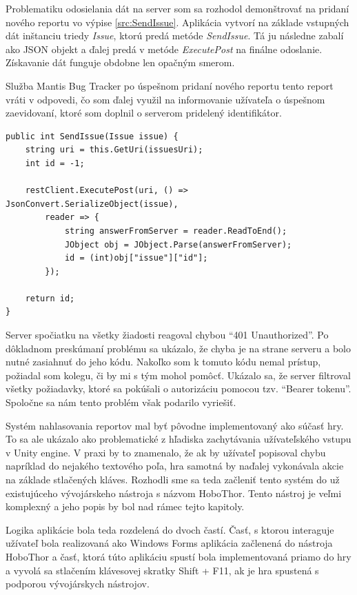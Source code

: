 \documentclass[slovak, bachelorpractice]{diploma}
\begin{document}
Problematiku odosielania dát na server som sa rozhodol demonštrovať na pridaní nového reportu vo výpise \ref{src:SendIssue}. Aplikácia vytvorí na základe vstupných dát inštanciu triedy \textit{Issue}, ktorú predá metóde \textit{SendIssue}. Tá ju následne zabalí ako JSON objekt a ďalej predá v metóde \textit{ExecutePost} na finálne odoslanie. Získavanie dát funguje obdobne len opačným smerom. 

Služba Mantis Bug Tracker po úspešnom pridaní nového reportu tento report vráti v odpovedi, čo som ďalej využil na informovanie užívateľa o úspešnom zaevidovaní, ktoré som doplnil o serverom pridelený identifikátor.
\vspace{10pt}
\begin{lstlisting}[label=src:SendIssue,caption={Programové odoslanie záznamu o chybe do služby Mantis Bug Tracker}]
public int SendIssue(Issue issue) {
	string uri = this.GetUri(issuesUri);
	int id = -1;

	restClient.ExecutePost(uri, () => JsonConvert.SerializeObject(issue),
        reader => {
            string answerFromServer = reader.ReadToEnd();
            JObject obj = JObject.Parse(answerFromServer);
            id = (int)obj["issue"]["id"];
        });

    return id;
}
\end{lstlisting}
Server spočiatku na všetky žiadosti reagoval chybou \enquote{401 Unauthorized}. Po dôkladnom preskúmaní problému sa ukázalo, že chyba je na strane serveru a bolo nutné zasiahnuť do jeho kódu. Nakoľko som k tomuto kódu nemal prístup, požiadal som kolegu, či by mi s tým mohol pomôcť. Ukázalo sa, že server filtroval všetky požiadavky, ktoré sa pokúšali o autorizáciu pomocou tzv. \enquote{Bearer tokenu}. Spoločne sa nám tento problém však podarilo vyriešiť. 

Systém nahlasovania reportov mal byť pôvodne implementovaný ako súčasť hry. To sa ale ukázalo ako problematické z hľadiska zachytávania užívateľského vstupu v Unity engine. V praxi by to znamenalo, že ak by užívateľ popisoval chybu napríklad do nejakého textového poľa, hra samotná by naďalej vykonávala akcie na základe stlačených kláves. Rozhodli sme sa teda začleniť tento systém do už existujúceho vývojárskeho nástroja s názvom HoboThor. Tento nástroj je veľmi komplexný a jeho popis by bol nad rámec tejto kapitoly.

Logika aplikácie bola teda rozdelená do dvoch častí. Časť, s ktorou interaguje užívateľ bola realizovaná ako Windows Forms aplikácia začlenená do nástroja HoboThor a časť, ktorá túto aplikáciu spustí bola implementovaná priamo do hry a vyvolá sa stlačením klávesovej skratky Shift + F11, ak je hra spustená s podporou vývojárskych nástrojov. 
\end{document}
